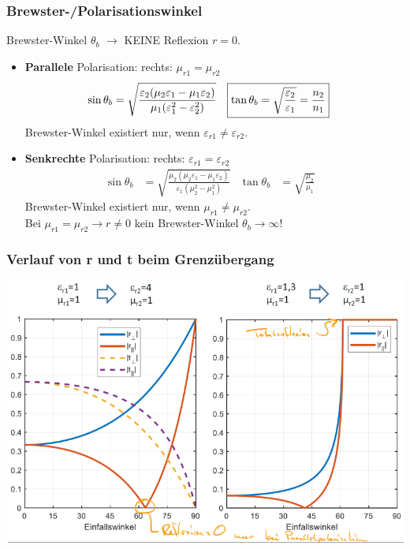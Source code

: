\subsubsection[Brewster-/Polarisationswinkel]{Brewster-/Polarisationswinkel}
Brewster-Winkel $ \theta_b $ $\rightarrow$ KEINE Reflexion $r=0$.
\begin{itemize}
	\item \textbf{Parallele} Polarisation: \quad rechts:
	      $ \mu_{r1}=\mu_{r2} $
	      \begin{align*}
		      \sin\theta_b         & = \sqrt{\frac{\varepsilon_2(\mu_2\varepsilon_1 - \mu_1\varepsilon_2)}{\mu_1(\varepsilon_1^2-\varepsilon_2^2)}} &
		      \Aboxed{\tan\theta_b & = \sqrt{\frac{\varepsilon_2}{\varepsilon_1}} = \frac{n_2}{n_1}}                                                &
	      \end{align*}
	      Brewster-Winkel existiert nur, wenn $ \varepsilon_{r1} \neq \varepsilon_{r2} $.
	\item \textbf{Senkrechte} Polarisation:  \quad rechts: $ \varepsilon_{r1} = \varepsilon_{r2} $
	      \begin{align*}
		      \sin\theta_b & = \sqrt{\frac{\mu_2(\mu_2\varepsilon_1 - \mu_1\varepsilon_2)}{\varepsilon_1(\mu_2^2-\mu_1^2)}} &
		      \tan\theta_b & = \sqrt{\frac{\mu_2}{\mu_1}}                                                                   &
	      \end{align*}
	      Brewster-Winkel existiert nur, wenn $ \mu_{r1} \neq \mu_{r2} $.\\
	      Bei $ \mu_{r1}=\mu_{r2} \rightarrow r \neq 0$ \qquad kein Brewster-Winkel $\theta_b \rightarrow \infty$!
\end{itemize}

\subsubsection{Verlauf von r und t beim Grenzübergang}
\includegraphics[width=\columnwidth]{Figures/Totalreflexion_Diagramm.png}

